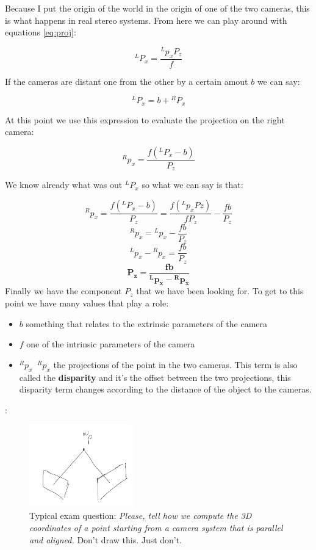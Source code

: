 Because I put the origin of the world in the origin of one of the two cameras, this is what happens in real stereo systems. From here we can play around with equations \ref{eq:proj}:

\[
    {}^LP_x = \frac{{}^Lp_xP_z}{f}    
\]

If the cameras are distant one from the other by a certain amout \(b\) we can say:

\[
    {}^LP_x = b+{}^RP_x
\]

At this point we use this expression to evaluate the projection on the right camera:

\[
    {}^Rp_x = \frac{f({}^LP_x-b)}{P_z}    
\]

We know already what was out \({}^LP_x\) so what we can say is that: 

\[
    {}^Rp_x = \frac{f({}^LP_x-b)}{P_z}    
    =
    \frac{f({}^Lp_xPz)}{fP_z}-\frac{fb}{P_z}
\]
\[
    {}^Rp_x ={}^Lp_x-\frac{fb}{P_z}
\]
\[
    {}^Lp_x- {}^Rp_x = \frac{fb}{P_z}
\]
\[
    \bm{{P_z} = \frac{fb}{{}^Lp_x- {}^Rp_x}}
\]
Finally we have the component \(P_z\) that we have been looking for. To get to this point we have many values that play a role:
\begin{itemize}
    \item \(b\)  something that relates to the extrinsic parameters of the camera
    \item \(f\) one of the intrinsic parameters of the camera
    \item \({}^Rp_x \;\; {}^Rp_x\) the projections of the point in the two cameras. This term is also called the \textbf{disparity} and it's the offset between the two projections, this disparity term changes according to the distance of the object to the cameras.
\end{itemize}

: 

\begin{figure}[H]
    \centering
    \includegraphics[width=0.4\textwidth]{Figures/mistake.png}
    \caption{Typical exam question: \textit{Please, tell how we compute the 3D coordinates of a point starting from a camera system that is parallel and aligned.} Don't draw this. Just don't.}
    \label{fig:mistake}
\end{figure}

